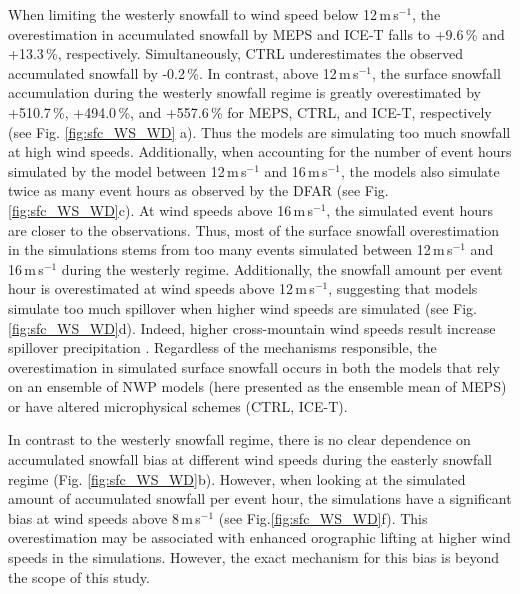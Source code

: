 \documentclass{ametsocV5}
\begin{document}
		When limiting the westerly snowfall to wind speed below 12\,m\,s$^{-1}$, the overestimation in accumulated snowfall by MEPS and ICE-T falls to +9.6\,\% and +13.3\,\%, respectively. Simultaneously, CTRL underestimates the observed accumulated snowfall by -0.2\,\%. In contrast, above 12\,m\,s$^{-1}$, the surface snowfall accumulation during the westerly snowfall regime is greatly overestimated by +510.7\,\%, +494.0\,\%, and +557.6\,\% for MEPS, CTRL, and ICE-T, respectively (see Fig. \ref{fig:sfc_WS_WD} a). Thus the models are simulating too much snowfall at high wind speeds. Additionally, when accounting for the number of event hours simulated by the model between 12\,m\,s$^{-1}$ and 16\,m\,s$^{-1}$, the models also simulate twice as many event hours as observed by the DFAR (see Fig. \ref{fig:sfc_WS_WD}c). At wind speeds above 16\,m\,s$^{-1}$, the simulated event hours are closer to the observations. Thus, most of the surface snowfall overestimation in the simulations stems from too many events simulated between 12\,m\,s$^{-1}$ and 16\,m\,s$^{-1}$ during the westerly regime. Additionally, the snowfall amount per event hour is overestimated at wind speeds above 12\,m\,s$^{-1}$, suggesting that models simulate too much spillover when higher wind speeds are simulated (see Fig. \ref{fig:sfc_WS_WD}d). Indeed, higher cross-mountain wind speeds result increase spillover precipitation \citep{chater_atmospheric_1998,kaplan_role_2012}. Regardless of the mechanisms responsible, the overestimation in simulated surface snowfall occurs in both the models that rely on an ensemble of NWP models (here presented as the ensemble mean of MEPS) or have altered microphysical schemes (CTRL, ICE-T). 
		
		In contrast to the westerly snowfall regime, there is no clear dependence on accumulated snowfall bias at different wind speeds during the easterly snowfall regime (Fig. \ref{fig:sfc_WS_WD}b). 
		However, when looking at the simulated amount of accumulated snowfall per event hour, the simulations have a significant bias at wind speeds above 8\,m\,s$^{-1}$ (see Fig.\ref{fig:sfc_WS_WD}f). This overestimation may be associated with enhanced orographic lifting at higher wind speeds in the simulations. However, the exact mechanism for this bias is beyond the scope of this study.
\end{document}
